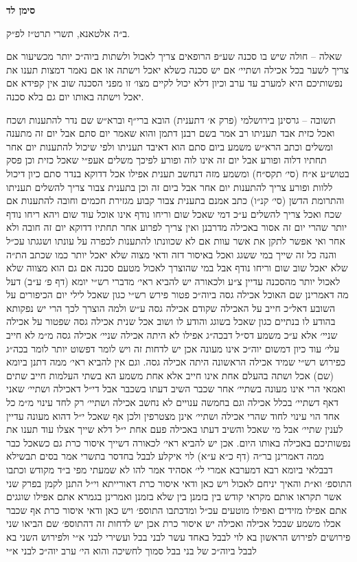 \documentclass[12pt, openany]{book}
\newcommand{\chapname}{}
\newcommand{\newchap}[1]{
	\addcontentsline{toc}{chapter}{#1}
	\renewcommand{\chapname}{#1}
		\begin{center}
			\textbf{%
\fontsize{16pt}{16pt}\selectfont
				#1}
		\end{center}
}
\begin{document}
\newchap{סימן לד}
\begin{multicols}{2}
ב״ה אלטאנא, תשרי תרט״ז לפ״ק.\\\vspace{0pt}

שאלה – חולה שיש בו סכנה שע״פ הרופאים צריך לאכול ולשתות ביוה״כ יותר מכשיעור אם צריך לשער בכל אכילה ושתיי׳ אם יש סכנה כשלא יאכל וישתה או אם נאמר דמצות תענו את נפשותיכם היא למערב עד ערב וכיון דלא יכול לקיים מצו׳ זו מפני הסכנה שוב אין קפידא אם יאכל וישתה באותו יום גם בלא סכנה.\\\vspace{0pt}

תשובה – גרסינן בירושלמי (פרק א׳ דתענית) הובא ברי״ף וברא״ש שם נדר להתענות ושכח ואכל כזית אבד תעניתו רב אמר בשם רבנן דתמן והוא שאמר יום סתם אבל יום זה מתענה ומשלים וכתב הרא״ש משמע ביום סתם הוא דאיבד תעניתו ולפי שיכול להתענות יום אחר תחתיו דלוה ופורע אבל יום זה אינו לוה ופורע לפיכך משלים אעפ״י שאכל כזית וכן פסק בטוש״ע א״ח (סי׳ תקס״ח) ומשמע מזה דנחשב תענית אפילו אכל דדוקא בנדר סתם כיון דיכול ללוות ופורע צריך להתענות יום אחר אבל ביום זה וכן בתענית צבור צריך להשלים תעניתו והתרומת הדשן (סי׳ קנ״ו) כתב אמנם בתענית צבור קבוע מגזירת חכמים וחובה להתענות אם שכח ואכל צריך להשלים ע״כ דמי שאכל שום וריחו נודף אינו אוכל עוד שום ויהא ריחו נודף יותר שהרי יום זה אסור באכילה מדרבנן ואין צריך לפרוע אחר תחתיו דדוקא יום זה חובה ולא אחר ואי אפשר לתקן את אשר עוות אם לא שכוונתו להתענות לכפרה על עונתו ושגגתו עכ״ל והנה כל זה שייך במי ששגג ואכל באיסור דזה ודאי מצוה שלא יאכל יותר כמו שכתב הת״ה שלא יאכל שוב שום וריחו נודף אבל במי שהוצרך לאכול מטעם סכנה אם גם הוא מצווה שלא לאכול יותר מהסכנה עדיין צ״ע ולכאורה יש להביא ראי׳ מדברי רש״י יומא (דף פ׳ ע״ב) דעל מה דאמרינן שם האוכל אכילה גסה ביוה״כ פטור פירש רש״י כגון שאכל לילי יום הכיפורים על השובע דאל״כ חייב על האכילה שקודם אכילה גסה ע״ש ולמה הוצרך לכך הרי יש נפקותא בהודע לו בנתיים כגון שאכל בשוגג והודע לו ושוב אכל שנית אכילה גסה שפטור על אכילה שניי׳ אלא ע״כ משמע דס״ל דבכה״ג אפילו לא היתה אכילה שניי׳ אכילה גסה מ״מ לא חייב עלי׳ עוד כיון דמשום יוה״כ אינו מעונה אכן יש לדחות זה ויש לומר דפשוט יותר לומר בכה״ג כפירוש רש״י שמיד אכילה הראשונה היתה אכילה גסה. וגם אין להביא ראי׳ ממה דתנן ביומא (שם) אכל ושתה בהעלם אחת אינו חייב אלא אחת משמע הא בשתי העלמות חייב שתים ואמאי הרי אינו מעונה בשתיי׳ אחר שכבר השיב דעתו בשכבר אבל די״ל דאכילה ושתיי׳ שאני דאף דשתיי׳ בכלל אכילה וגם בחמשה ענויים לא נחשב אכילה ושתיי׳ רק לחד עינוי מ״מ כל אחד הוי עינוי לחוד שהרי אכילה ושתיי׳ אינן מצטרפין ולכן אף שאכל י״ל דהוא מעונה עדיין לענין שתיי׳ אבל מי שאכל והשיב דעתו באכילה פעם אחת י״ל דלא שייך אצלו עוד תענו את נפשותיכם באכילה באותו היום. אכן יש להביא ראי׳ לכאורה דשייך איסור כרת גם כשאכל כבר ממה דאמרינן בר״ה (דף כ״א ע״א) לוי איקלע לבבל בחדסר בתשרי אמר בסים תבשילא דבבלאי ביומא רבא דמערבא אמרי לי׳ אסהיד אמר להו לא שמעתי מפי ב״ד מקודש וכתבו התוספ׳ וא״ת והאיך יניחם לאכול ויש כאן ודאי איסור כרת דאורייתא וי״ל התנן לקמן בפרק שני אשר תקראו אותם מקראי קודש בין בזמנן בין שלא בזמנן ואמרינן בגמרא אתם אפילו שוגגים אתם אפילו מזידים ואפילו מוטעים עכ״ל ומדכתבו התוספ׳ ויש כאן ודאי איסור כרת אף שכבר אכלו משמע שבכל אכילה ואכילה יש איסור כרת אכן יש לדחות זה דהתוספ׳ שם הביאו שני פירושים לפירוש הראשון בא לוי לבבל באחד עשר לבני בבל ועשירי לבני א״י ולפירוש השני בא לבבל ביוה״כ של בני בבל סמוך לחשיכה והוא הי׳ ערב יוה״כ לבני א״י 
\end{multicols}
\end{document}
